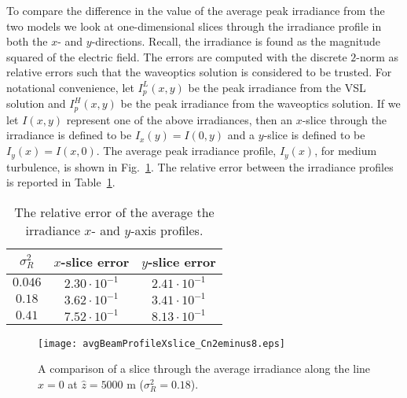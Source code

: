 \documentclass[9pt,twocolumn,twoside]{osajnl}
\begin{document}
To compare the difference in the value of the average peak irradiance from the 
two models we look at one-dimensional slices through the irradiance profile in 
both the $x$- and $y$-directions. Recall, the irradiance is found as the magnitude 
squared of the electric field. The errors are computed with the discrete $2$-norm as 
relative errors such that the waveoptics solution is considered to be trusted.  
For notational convenience, let $I^{L}_{p}(x,y)$ be the peak irradiance from the 
VSL solution and $I^{H}_{p}(x,y)$ be the peak irradiance from the waveoptics solution. 
If we let $I(x,y)$ represent one of the above irradiances, then an $x$-slice through 
the irradiance is defined to be $I_{x}(y) = I(0,y)$ and a $y$-slice is defined to be 
$I_{y}(x) = I(x,0)$. 
The average peak irradiance profile, $I_{y}(x)$, for medium turbulence, is shown 
in Fig.~\ref{fig:irradiancexslice}. The relative error between the irradiance profiles 
is reported in Table~\ref{tab:irrslice_errors}.


\begin{table}[b!]
	\centering \vspace*{-3mm}
	\caption{The relative error of the average the irradiance $x$- and $y$-axis profiles.} \label{tab:irrslice_errors}
	\begin{tabular}{ccc}
		\hline
		$\sigma_{R}^2$ 		& $x$-slice error		& $y$-slice error  \\ 
		\hline 
		$0.046$ 			& $2.30 \cdot 10^{-1}$ 	&  $2.41 \cdot 10^{-1}$ \\
		$0.18$		        & $3.62 \cdot 10^{-1}$  &  $3.41 \cdot 10^{-1}$ \\
		$0.41$              & $7.52\cdot 10^{-1}$    & $8.13\cdot 10^{-1}$    \\
		\hline
	\end{tabular}
\end{table}



\begin{figure}[t!]
	\centering
	\texttt{[image: avgBeamProfileXslice\_Cn2eminus8.eps]}
	\caption{A comparison of a slice through the average irradiance along the line $x = 0$ at $\widehat{z} = 5000$ m ($\sigma_{R}^{2} = 0.18$).}\label{fig:irradiancexslice} \vspace*{-3mm}
\end{figure}
\end{document}
